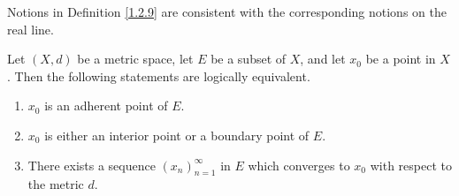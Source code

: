 \begin{note}
    Notions in Definition \ref{1.2.9} are consistent with the corresponding notions on the real line.
\end{note}

\begin{proposition}\label{1.2.10}
    Let \((X, d)\) be a metric space, let \(E\) be a subset of \(X\), and let \(x_0\) be a point in \(X\).
    Then the following statements are logically equivalent.
    \begin{enumerate}
        \item \(x_0\) is an adherent point of \(E\).
        \item \(x_0\) is either an interior point or a boundary point of \(E\).
        \item There exists a sequence \((x_n)_{n = 1}^\infty\) in \(E\) which converges to \(x_0\) with respect to the metric \(d\).
    \end{enumerate}
\end{proposition}

